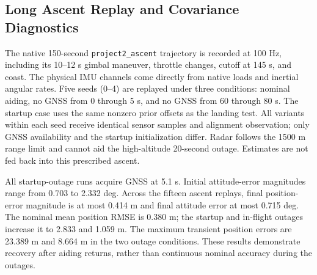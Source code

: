 \subsection{Long Ascent Replay and Covariance Diagnostics}\label{sec:nav-consistency}
The native 150-second \texttt{project2\_ascent} trajectory is recorded at 100 Hz,
including its 10--12 s gimbal maneuver, throttle changes, cutoff at 145 s, and coast.
The physical IMU channels come directly from native loads and inertial angular rates.
Five seeds (0--4) are replayed under three conditions: nominal aiding, no GNSS from
0 through 5 s, and no GNSS from 60 through 80 s. The startup case uses the same nonzero
prior offsets as the landing test. All variants within each seed receive identical
sensor samples and alignment observation; only GNSS availability and the startup
initialization differ. Radar follows the 1500 m range limit and cannot aid the
high-altitude 20-second outage. Estimates are not fed back into this prescribed ascent.
\begin{table}[!htbp]\centering\small
\caption{Five-seed 150-second ascent replay. RMSE columns are means of per-run RMSEs;
NEES is averaged over the five seeds and all sampled epochs.}\label{tab:nav-ascent}

\end{table}
\FloatBarrier
All startup-outage runs acquire GNSS at 5.1 s. Initial attitude-error magnitudes range
from 0.703 to 2.332 deg. Across the fifteen ascent replays, final position-error magnitude
is at most 0.414 m and final attitude error at most 0.715 deg. The nominal mean position
RMSE is 0.380 m; the startup and in-flight outages increase it to 2.833 and 1.059 m.
The maximum transient position errors are 23.389 m and 8.664 m in the two outage
conditions. These results demonstrate recovery after aiding returns, rather than
continuous nominal accuracy during the outages.

